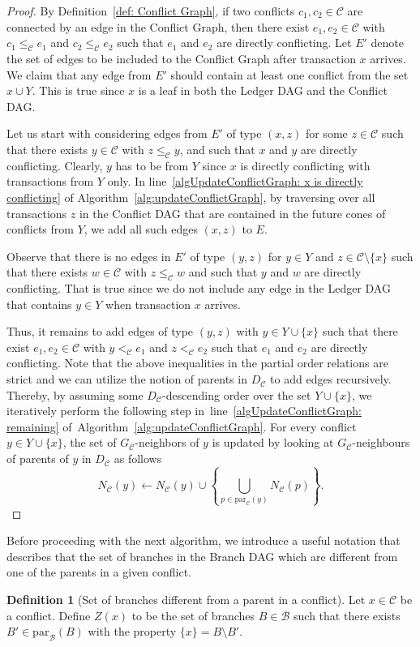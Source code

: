 \documentclass[11pt]{article}
\newcommand{\branchset}{\mathcal{B}}
\newcommand{\conflictset}{\mathcal{C}}
\newcommand{\ConflictDAG}{D_{\conflictset}}
\newcommand{\ConflictGraph}{G_{\conflictset}}
\newcommand{\parent}[2]{\mathrm{par}_{#1}\left(#2\right)}
\theoremstyle{plain}
\theoremstyle{definition}
\newtheorem{definition}{Definition}
\numberwithin{definition}{section}
\numberwithin{lemma}{section}
\numberwithin{ass}{section}
\numberwithin{remark}{section}
\numberwithin{example}{section}
\numberwithin{proposition}{section}
\numberwithin{theorem}{section}
\begin{document}
\begin{proof}
By Definition~\ref{def: Conflict Graph}, if two conflicts $c_1,c_2\in \conflictset$ are connected by an edge in the Conflict Graph, then there exist $e_1,e_2\in \conflictset$ with $c_1\le_{\conflictset} e_1$ and $c_2\le_{\conflictset} e_2$ such that $e_1$ and $e_2$ are directly conflicting. Let $E'$ denote the set of edges to be included to the Conflict Graph after transaction $x$ arrives. We claim that any edge from $E'$ should contain at least one conflict from the set $x\cup Y$. This is true since $x$ is a leaf in both the Ledger DAG and the Conflict DAG.

Let us start with considering edges from $E'$ of type $(x,z)$ for some $z\in\conflictset$ such that there exists $y\in \conflictset$ with $z\le_{\conflictset} y$, and such that $x$ and $y$ are directly conflicting. 
Clearly, $y$ has to be from $Y$ since $x$ is directly conflicting with transactions from $Y$ only.
In line~\ref{algUpdateConflictGraph: x is directly conflicting} of Algorithm~\ref{alg:updateConflictGraph}, by traversing over all transactions $z$ in the Conflict DAG that are contained in the future cones of conflicts from $Y$, we add all such edges $(x,z)$ to $E$.

Observe that there is no edges in $E'$ of type $(y,z)$ for $y\in Y$ and $z\in \conflictset\setminus\{x\}$ such that
there exists $w\in \conflictset$ with $z\le_{\conflictset} w$  and such that $y$ and $w$ are directly conflicting. That is true since we do not include any edge in the Ledger DAG that contains $y\in Y$ when transaction $x$ arrives.

Thus, it remains to add edges of type $(y,z)$ with $y\in Y\cup \{x\}$ such that there exist $e_1,e_2\in \conflictset$ with $y<_{\conflictset} e_1$ and $z<_{\conflictset} e_2$ such that $e_1$ and $e_2$ are directly conflicting. Note that the above inequalities in the partial order relations are strict and we can utilize the notion of parents in $\ConflictDAG$ to add edges recursively. Thereby, by assuming some  $\ConflictDAG$-descending order over the set $Y\cup\{x\}$, we iteratively perform the following step in~line~\ref{algUpdateConflictGraph: remaining} of~Algorithm~\ref{alg:updateConflictGraph}.  For every conflict  $y\in  Y\cup\{x\}$, the set of $\ConflictGraph$-neighbors of $y$  is updated by looking at $\ConflictGraph$-neighbours of parents  of $y$ in $\ConflictDAG$ as follows 
$$
N_{\conflictset}(y)\gets N_{\conflictset}(y) \cup \left\{\bigcup_{p\in\parent{\conflictset}{y}} N_{\conflictset}(p)\right\}.
$$
\end{proof}
\iffalse
Before proceeding with the next algorithm, we introduce a useful notation that describes that the set of branches in the Branch DAG which are different from one of the parents in a given conflict.
\begin{definition}[Set of branches different from a parent in a conflict]\label{def: branches different in a parent}
Let $x\in\conflictset$ be a conflict. Define $Z(x)$ to be the set of branches ${B}\in \branchset$ such that there exists ${B}'\in \parent{\branchset}{B}$ with the property $\{x\}={B}\setminus {B}'$.
\end{definition}
\end{document}
